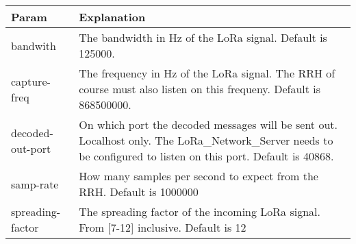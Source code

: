 \begin{longtable}[]{@{}ll@{}}
\toprule
\begin{minipage}[b]{0.18\columnwidth}\raggedright\strut
Param\strut
\end{minipage} & \begin{minipage}[b]{0.18\columnwidth}\raggedright\strut
Explanation\strut
\end{minipage}\tabularnewline
\midrule
\endhead
\begin{minipage}[t]{0.18\columnwidth}\raggedright\strut
bandwith\strut
\end{minipage} & \begin{minipage}[t]{0.18\columnwidth}\raggedright\strut
The bandwidth in Hz of the LoRa signal. Default is 125000.\strut
\end{minipage}\tabularnewline
\begin{minipage}[t]{0.18\columnwidth}\raggedright\strut
capture-freq\strut
\end{minipage} & \begin{minipage}[t]{0.18\columnwidth}\raggedright\strut
The frequency in Hz of the LoRa signal. The RRH of course must also
listen on this frequeny. Default is 868500000.\strut
\end{minipage}\tabularnewline
\begin{minipage}[t]{0.18\columnwidth}\raggedright\strut
decoded-out-port\strut
\end{minipage} & \begin{minipage}[t]{0.18\columnwidth}\raggedright\strut
On which port the decoded messages will be sent out. Localhost only. The
LoRa\_Network\_Server needs to be configured to listen on this port.
Default is 40868.\strut
\end{minipage}\tabularnewline
\begin{minipage}[t]{0.18\columnwidth}\raggedright\strut
samp-rate\strut
\end{minipage} & \begin{minipage}[t]{0.18\columnwidth}\raggedright\strut
How many samples per second to expect from the RRH. Default is
1000000\strut
\end{minipage}\tabularnewline
\begin{minipage}[t]{0.18\columnwidth}\raggedright\strut
spreading-factor\strut
\end{minipage} & \begin{minipage}[t]{0.18\columnwidth}\raggedright\strut
The spreading factor of the incoming LoRa signal. From {[}7-12{]}
inclusive. Default is 12\strut
\end{minipage}\tabularnewline

\end{longtable}

